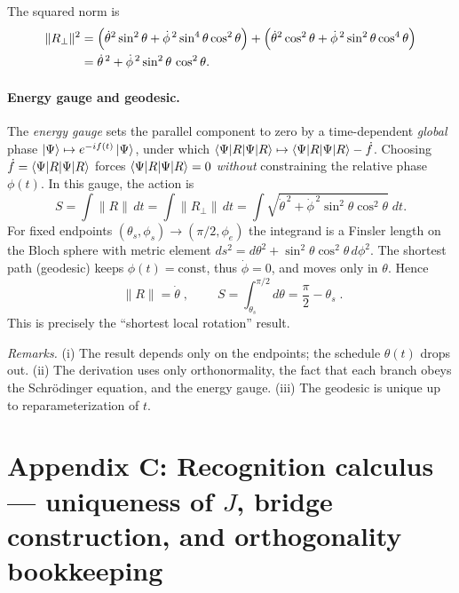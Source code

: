 \documentclass[11pt,letterpaper]{article}
\begin{document}
The squared norm is
\begin{align}
\|R_\perp\|^2
&=\Bigl(\dot\theta^2\sin^2\theta+\dot\phi^{\,2}\sin^4\theta\cos^2\theta\Bigr)
 + \Bigl(\dot\theta^2\cos^2\theta+\dot\phi^{\,2}\sin^2\theta\cos^4\theta\Bigr)\nonumber\\
&=\dot\theta^{\,2}+\dot\phi^{\,2}\sin^2\theta\,\cos^2\theta.
\label{eq:A-Rperp-norm}
\end{align}

\paragraph{Energy gauge and geodesic.}
The \emph{energy gauge} sets the parallel component to zero by a time-dependent \emph{global} phase $\ket{\Psi}\mapsto e^{-if(t)}\ket{\Psi}$, under which $\braket{\Psi|R}\mapsto \braket{\Psi|R}-\dot f$. Choosing $\dot f=\braket{\Psi|R}$ forces $\braket{\Psi|R}=0$ \emph{without} constraining the relative phase $\phi(t)$. In this gauge, the action is
\begin{equation}
S=\int\!\|R\|\,dt=\int\!\|R_\perp\|\,dt=\int\!\sqrt{\dot\theta^{\,2}+\dot\phi^{\,2}\sin^2\theta\cos^2\theta}\;dt.
\label{eq:A-S-energy-gauge}
\end{equation}
For fixed endpoints $(\theta_s,\phi_s)\to(\pi/2,\phi_e)$ the integrand is a Finsler length on the Bloch sphere with metric element $ds^2=d\theta^2+\sin^2\theta\cos^2\theta\,d\phi^2$. The shortest path (geodesic) keeps $\phi(t)=\mathrm{const}$, thus $\dot\phi=0$, and moves only in $\theta$. Hence
\begin{equation}
\boxed{\;\|R\|=\dot\theta\;},\qquad
\boxed{\;S=\int_{\theta_s}^{\pi/2}\!d\theta=\frac{\pi}{2}-\theta_s\;}.
\label{eq:A-main}
\end{equation}
This is precisely the “shortest local rotation” result. %
\medskip

\noindent
\emph{Remarks.} (i) The result depends only on the endpoints; the schedule $\theta(t)$ drops out. (ii) The derivation uses only orthonormality, the fact that each branch obeys the Schrödinger equation, and the energy gauge. (iii) The geodesic is unique up to reparameterization of $t$. %

\section*{Appendix C: Recognition calculus — uniqueness of \texorpdfstring{$J$}{J}, bridge construction, and orthogonality bookkeeping}
\end{document}
